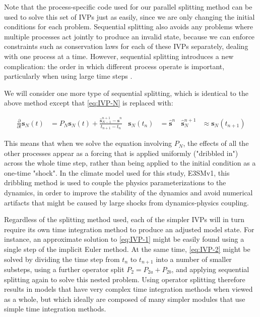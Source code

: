 \documentclass [11pt, proquest] {uwthesis}[2020/02/24]
\begin{document}
Note that the process-specific code used for our parallel splitting method can be used to solve this set of IVPs just as easily, since we are only changing the initial conditions for each problem. Sequential splitting also avoids any problems where multiple processes act jointly to produce an invalid state, because we can enforce constraints such as conservation laws for each of these IVPs separately, dealing with one process at a time. However, sequential splitting introduces a new complication: the order in which different process operate is important, particularly when using large time steps \parencite{Beljaars2004,Donahue2018}.

We will consider one more type of sequential splitting, which is identical to the above method except that \eqref{eq:IVP-N} is replaced with:

\begin{align}
    \frac{\partial}{\partial t} \mathbf{s}_N(t) &= P_N \mathbf{s}_N(t) + \frac{\hat{\mathbf{s}}_{N-1}^{n+1} - \hat{\mathbf{s}}^n}{t_{n+1} - t_n} & \mathbf{s}_N(t_n) &= \hat{\mathbf{s}}^n & \hat{\mathbf{s}}^{n+1}_N &\approx \mathbf{s}_N(t_{n+1})
\end{align}

This means that when we solve the equation involving $P_N$, the effects of all the other processes appear as a forcing that is applied uniformly ("dribbled in") across the whole time step, rather than being applied to the initial condition as a one-time "shock". In the climate model used for this study, E3SMv1, this dribbling method is used to couple the physics parameterizations to the dynamics, in order to improve the stability of the dynamics and avoid numerical artifacts that might be caused by large shocks from dynamics-physics coupling.

Regardless of the splitting method used, each of the simpler IVPs will in turn require its own time integration method to produce an adjusted model state. For instance, an approximate solution to \eqref{eq:IVP-1} might be easily found using a single step of the implicit Euler method. At the same time, \eqref{eq:IVP-2} might be solved by dividing the time step from $t_n$ to $t_{n+1}$ into a number of smaller substeps, using a further operator split $P_2 = P_{2a} + P_{2b}$, and applying sequential splitting again to solve this nested problem. Using operator splitting therefore results in models that have very complex time integration methods when viewed as a whole, but which ideally are composed of many simpler modules that use simple time integration methods.
\end{document}
